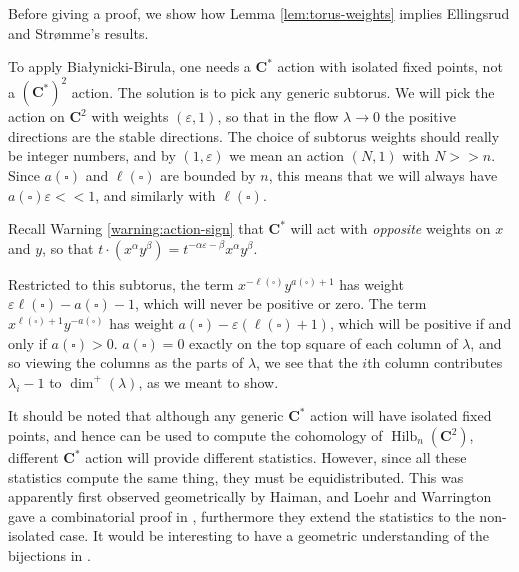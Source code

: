 \documentclass{amsart}[12pt]
\theoremstyle{definition}
\newcommand{\C}{\mathbf{C}}
\DeclareMathOperator{\Hilb}{Hilb}
\begin{document}
Before giving a proof, we show how Lemma \ref{lem:torus-weights} implies Ellingsrud and Str\o mme's results. 

To apply Bia\l ynicki-Birula, one needs a $\C^*$ action with isolated fixed points, not a $(\C^*)^2$ action.  The solution is to pick any generic subtorus.  We will pick the action on $\C^2$ with weights $(\varepsilon,1)$, so that in the flow $\lambda\to 0$ the positive directions are the stable directions.  The choice of subtorus weights should really be integer numbers, and by $(1,\varepsilon)$ we mean an action $(N,1)$ with $N>>n$. Since $a(\square)$ and $\ell(\square)$ are bounded by $n$, this means that we will always have $a(\square)\varepsilon<<1$, and similarly with $\ell(\square)$.

Recall Warning \ref{warning:action-sign} that $\C^*$ will act with \emph{opposite} weights on $x$ and $y$, so that $t\cdot(x^\alpha y^\beta)=t^{-\alpha\varepsilon-\beta}x^\alpha y^\beta$.  

Restricted to this subtorus, the term $x^{-\ell(\square)} y^{a(\square)+1}$ has weight $\varepsilon\ell(\square)-a(\square)-1$, which will never be positive or zero.  The term $x^{\ell(\square)+1}y^{-a(\square)}$ has weight $a(\square)-\varepsilon(\ell(\square)+1)$, which will be positive if and only if $a(\square)>0$.  $a(\square)=0$ exactly on the top square of each column of $\lambda$, and so viewing the columns as the parts of $\lambda$, we see that the $i$th column contributes $\lambda_i-1$ to $\dim^+(\lambda)$, as we meant to show.



\begin{center}
\end{center}



It should be noted that although any generic $\C^*$ action will have isolated fixed points, and hence can be used to compute the cohomology of $\Hilb_n(\C^2)$, different $\C^*$ action will provide different statistics.  However, since all these statistics compute the same thing, they must be equidistributed.  This was apparently first observed geometrically by Haiman, and Loehr and Warrington gave a combinatorial proof in \cite{LW}, furthermore they extend the statistics to the non-isolated case.  It would be interesting to have a geometric understanding of the bijections in \cite{LW}.
\end{document}
